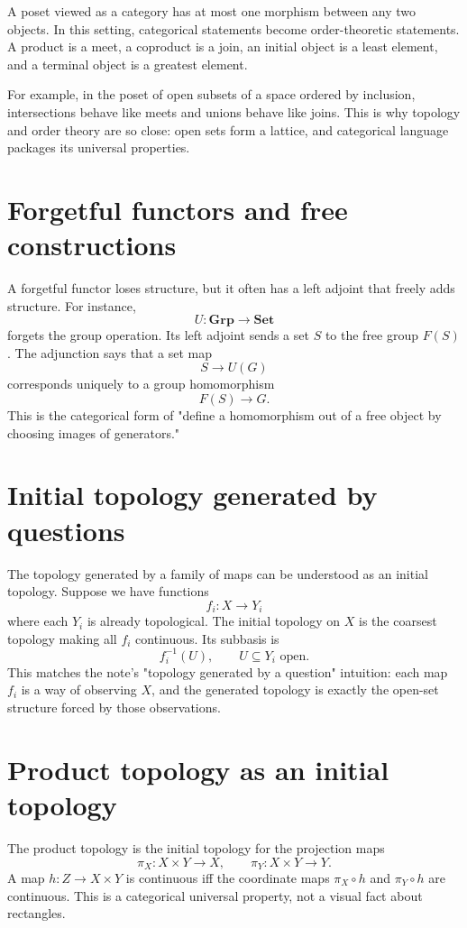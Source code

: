 A poset viewed as a category has at most one morphism between any two objects.  In this setting, categorical statements become order-theoretic statements.  A product is a meet, a coproduct is a join, an initial object is a least element, and a terminal object is a greatest element.

For example, in the poset of open subsets of a space ordered by inclusion, intersections behave like meets and unions behave like joins.  This is why topology and order theory are so close: open sets form a lattice, and categorical language packages its universal properties.

\section{Forgetful functors and free constructions}

A forgetful functor loses structure, but it often has a left adjoint that freely adds structure.  For instance,
\[
  U:\mathbf{Grp}\to\mathbf{Set}
\]
forgets the group operation.  Its left adjoint sends a set \(S\) to the free group \(F(S)\).  The adjunction says that a set map
\[
  S\to U(G)
\]
corresponds uniquely to a group homomorphism
\[
  F(S)\to G.
\]
This is the categorical form of "define a homomorphism out of a free object by choosing images of generators."

\section{Initial topology generated by questions}

The topology generated by a family of maps can be understood as an initial topology.  Suppose we have functions
\[
  f_i:X\to Y_i
\]
where each \(Y_i\) is already topological.  The initial topology on \(X\) is the coarsest topology making all \(f_i\) continuous.  Its subbasis is
\[
  f_i^{-1}(U),\qquad U\subseteq Y_i\text{ open}.
\]
This matches the note's "topology generated by a question" intuition: each map \(f_i\) is a way of observing \(X\), and the generated topology is exactly the open-set structure forced by those observations.

\section{Product topology as an initial topology}

The product topology is the initial topology for the projection maps
\[
  \pi_X:X\times Y\to X,\qquad \pi_Y:X\times Y\to Y.
\]
A map \(h:Z\to X\times Y\) is continuous iff the coordinate maps \(\pi_X\circ h\) and \(\pi_Y\circ h\) are continuous.  This is a categorical universal property, not a visual fact about rectangles.

